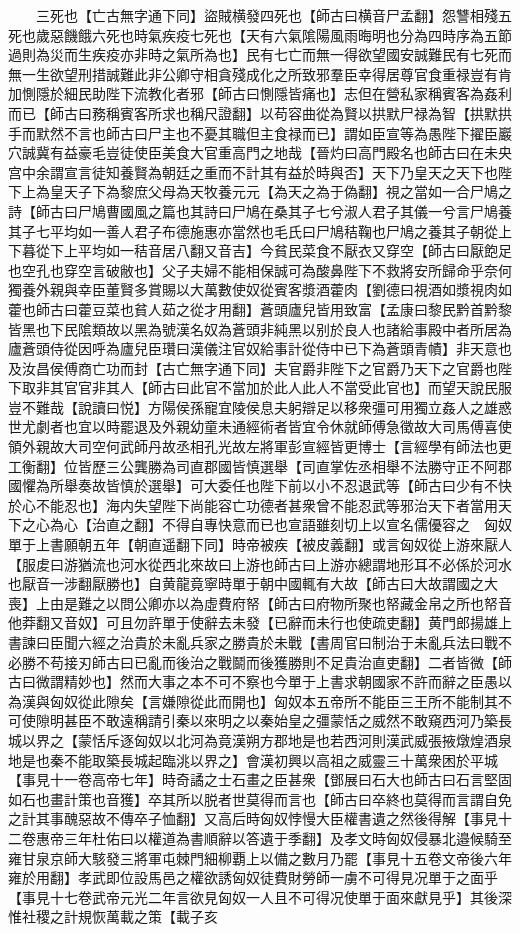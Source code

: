 　　三死也【亡古無字通下同】盜賊横發四死也【師古曰横音尸孟翻】怨讐相殘五死也歲惡饑餓六死也時氣疾疫七死也【天有六氣隂陽風雨晦明也分為四時序為五節過則為災而生疾疫亦非時之氣所為也】民有七亡而無一得欲望國安誠難民有七死而無一生欲望刑措誠難此非公卿守相貪殘成化之所致邪羣臣幸得居尊官食重禄豈有肯加惻隱於細民助陛下流教化者邪【師古曰惻隱皆痛也】志但在營私家稱賓客為姦利而已【師古曰務稱賓客所求也稱尺證翻】以苟容曲從為賢以拱默尸禄為智【拱默拱手而默然不言也師古曰尸主也不憂其職但主食禄而已】謂如臣宣等為愚陛下擢臣巖穴誠冀有益豪毛豈徒使臣美食大官重高門之地哉【晉灼曰高門殿名也師古曰在未央宫中余謂宣言徒知養賢為朝廷之重而不計其有益於時與否】天下乃皇天之天下也陛下上為皇天子下為黎庶父母為天牧養元元【為天之為于偽翻】視之當如一合尸鳩之詩【師古曰尸鳩曹國風之篇也其詩曰尸鳩在桑其子七兮淑人君子其儀一兮言尸鳩養其子七平均如一善人君子布德施惠亦當然也毛氏曰尸鳩秸鞠也尸鳩之養其子朝從上下暮從下上平均如一秸音居八翻又音吉】今貧民菜食不厭衣又穿空【師古曰厭飽足也空孔也穿空言破敝也】父子夫婦不能相保誠可為酸鼻陛下不救將安所歸命乎奈何獨養外親與幸臣董賢多賞賜以大萬數使奴從賓客漿酒藿肉【劉德曰視酒如漿視肉如藿也師古曰藿豆菜也貧人茹之從才用翻】蒼頭廬兒皆用致富【孟康曰黎民黔首黔黎皆黑也下民隂類故以黑為號漢名奴為蒼頭非純黑以别於良人也諸給事殿中者所居為廬蒼頭侍從因呼為廬兒臣瓚曰漢儀注官奴給事計從侍中已下為蒼頭青幘】非天意也及汝昌侯傅商亡功而封【古亡無字通下同】夫官爵非陛下之官爵乃天下之官爵也陛下取非其官官非其人【師古曰此官不當加於此人此人不當受此官也】而望天說民服豈不難哉【說讀曰悦】方陽侯孫寵宜陵侯息夫躬辯足以移衆彊可用獨立姦人之雄惑世尤劇者也宜以時罷退及外親幼童未通經術者皆宜令休就師傅急徵故大司馬傅喜使領外親故大司空何武師丹故丞相孔光故左將軍彭宣經皆更博士【言經學有師法也更工衡翻】位皆歷三公龔勝為司直郡國皆慎選舉【司直掌佐丞相舉不法勝守正不阿郡國懼為所舉奏故皆慎於選舉】可大委任也陛下前以小不忍退武等【師古曰少有不快於心不能忍也】海内失望陛下尚能容亡功德者甚衆曾不能忍武等邪治天下者當用天下之心為心【治直之翻】不得自專快意而已也宣語雖刻切上以宣名儒優容之　匈奴單于上書願朝五年【朝直遥翻下同】時帝被疾【被皮義翻】或言匈奴從上游來厭人【服䖍曰游猶流也河水從西北來故曰上游也師古曰上游亦總謂地形耳不必係於河水也厭音一涉翻厭勝也】自黄龍竟寧時單于朝中國輒有大故【師古曰大故謂國之大喪】上由是難之以問公卿亦以為虛費府帑【師古曰府物所聚也帑藏金帛之所也帑音他莽翻又音奴】可且勿許單于使辭去未發【已辭而未行也使疏吏翻】黄門郎揚雄上書諫曰臣聞六經之治貴於未亂兵家之勝貴於未戰【書周官曰制治于未亂兵法曰戰不必勝不苟接刃師古曰已亂而後治之戰鬬而後獲勝則不足貴治直吏翻】二者皆微【師古曰微謂精妙也】然而大事之本不可不察也今單于上書求朝國家不許而辭之臣愚以為漢與匈奴從此隙矣【言嫌隙從此而開也】匈奴本五帝所不能臣三王所不能制其不可使隙明甚臣不敢遠稱請引秦以來明之以秦始皇之彊蒙恬之威然不敢窺西河乃築長城以界之【蒙恬斥逐匈奴以北河為竟漢朔方郡地是也若西河則漢武威張掖燉煌酒泉地是也秦不能取築長城起臨洮以界之】會漢初興以高祖之威靈三十萬衆困於平城【事見十一卷高帝七年】時奇譎之士石畫之臣甚衆【鄧展曰石大也師古曰石言堅固如石也畫計策也音獲】卒其所以脱者世莫得而言也【師古曰卒終也莫得而言謂自免之計其事醜惡故不傳卒子恤翻】又高后時匈奴悖慢大臣權書遺之然後得解【事見十二卷惠帝三年杜佑曰以權道為書順辭以答遺于季翻】及孝文時匈奴侵暴北邉候騎至雍甘泉京師大駭發三將軍屯棘門細柳覇上以備之數月乃罷【事見十五卷文帝後六年雍於用翻】孝武即位設馬邑之權欲誘匈奴徒費財勞師一虜不可得見况單于之面乎【事見十七卷武帝元光二年言欲見匈奴一人且不可得况使單于面來獻見乎】其後深惟社稷之計規恢萬載之策【載子亥